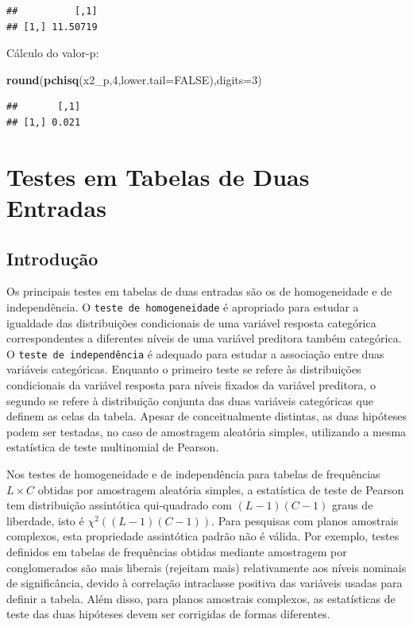 \documentclass[]{book}
\newenvironment{Shaded}{\begin{snugshade}}{\end{snugshade}}
\newcommand{\KeywordTok}[1]{\textcolor[rgb]{0.13,0.29,0.53}{\textbf{#1}}}
\newcommand{\DataTypeTok}[1]{\textcolor[rgb]{0.13,0.29,0.53}{#1}}
\newcommand{\DecValTok}[1]{\textcolor[rgb]{0.00,0.00,0.81}{#1}}
\newcommand{\OtherTok}[1]{\textcolor[rgb]{0.56,0.35,0.01}{#1}}
\newcommand{\NormalTok}[1]{#1}
\theoremstyle{definition}
\theoremstyle{definition}
\theoremstyle{definition}
\theoremstyle{remark}
\begin{document}
\begin{verbatim}
##          [,1]
## [1,] 11.50719
\end{verbatim}

Cálculo do valor-p:

\begin{Shaded}
\begin{Highlighting}[]
\KeywordTok{round}\NormalTok{(}\KeywordTok{pchisq}\NormalTok{(x2_p,}\DecValTok{4}\NormalTok{,}\DataTypeTok{lower.tail=}\OtherTok{FALSE}\NormalTok{),}\DataTypeTok{digits=}\DecValTok{3}\NormalTok{)}
\end{Highlighting}
\end{Shaded}

\begin{verbatim}
##       [,1]
## [1,] 0.021
\end{verbatim}

\chapter{Testes em Tabelas de Duas Entradas}\label{testetab2}

\section{Introdução}\label{introducao-2}

Os principais testes em tabelas de duas entradas são os de homogeneidade
e de independência. O \texttt{teste\ de\ homogeneidade} é apropriado
para estudar a igualdade das distribuições condicionais de uma variável
resposta categórica correspondentes a diferentes níveis de uma variável
preditora também categórica. O \texttt{teste\ de\ independência} é
adequado para estudar a associação entre duas variáveis categóricas.
Enquanto o primeiro teste se refere às distribuições condicionais da
variável resposta para níveis fixados da variável preditora, o segundo
se refere à distribuição conjunta das duas variáveis categóricas que
definem as celas da tabela. Apesar de conceitualmente distintas, as duas
hipóteses podem ser testadas, no caso de amostragem aleatória simples,
utilizando a mesma estatística de teste multinomial de Pearson.

Nos testes de homogeneidade e de independência para tabelas de
frequências \(L\times C\) obtidas por amostragem aleatória simples, a
estatística de teste de Pearson tem distribuição assintótica
qui-quadrado com \((L-1)(C-1)\) graus de liberdade, isto é
\(\chi ^{2}\left( (L-1)(C-1)\right)\). Para pesquisas com planos
amostrais complexos, esta propriedade assintótica padrão não é válida.
Por exemplo, testes definidos em tabelas de frequências obtidas mediante
amostragem por conglomerados são mais liberais (rejeitam mais)
relativamente aos níveis nominais de significância, devido à correlação
intraclasse positiva das variáveis usadas para definir a tabela. Além
disso, para planos amostrais complexos, as estatísticas de teste das
duas hipóteses devem ser corrigidas de formas diferentes.
\end{document}
